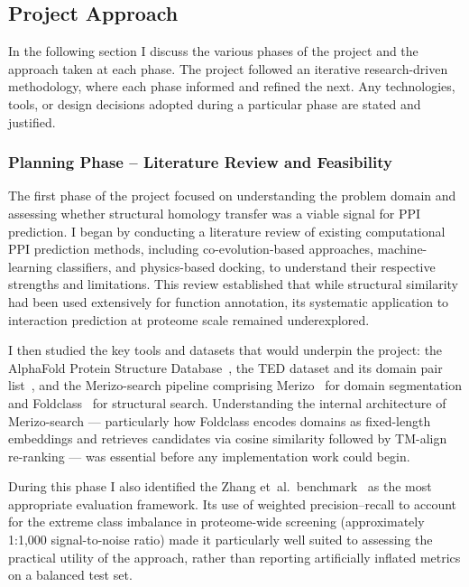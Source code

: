 \subsection{Project Approach}
\label{sec:intro-approach}

In the following section I discuss the various phases of the project and the approach taken at each phase.
The project followed an iterative research-driven methodology, where each phase informed and refined the next.
Any technologies, tools, or design decisions adopted during a particular phase are stated and justified.

\subsubsection{Planning Phase -- Literature Review and Feasibility}

The first phase of the project focused on understanding the problem domain and assessing whether structural homology transfer was a viable signal for PPI prediction.
I began by conducting a literature review of existing computational PPI prediction methods, including co-evolution-based approaches, machine-learning classifiers, and physics-based docking, to understand their respective strengths and limitations.
This review established that while structural similarity had been used extensively for function annotation, its systematic application to interaction prediction at proteome scale remained underexplored.

I then studied the key tools and datasets that would underpin the project: the AlphaFold Protein Structure Database~\cite{alphafold2}, the TED dataset and its domain pair list~\cite{ted_dataset}, and the Merizo-search pipeline comprising Merizo~\cite{merizo} for domain segmentation and Foldclass~\cite{merizo_search} for structural search.
Understanding the internal architecture of Merizo-search --- particularly how Foldclass encodes domains as fixed-length embeddings and retrieves candidates via cosine similarity followed by TM-align~\cite{tmalign} re-ranking --- was essential before any implementation work could begin.

During this phase I also identified the Zhang et~al.\ benchmark~\cite{zhang2025ppi} as the most appropriate evaluation framework.
Its use of weighted precision--recall to account for the extreme class imbalance in proteome-wide screening (approximately 1:1{,}000 signal-to-noise ratio) made it particularly well suited to assessing the practical utility of the approach, rather than reporting artificially inflated metrics on a balanced test set.

